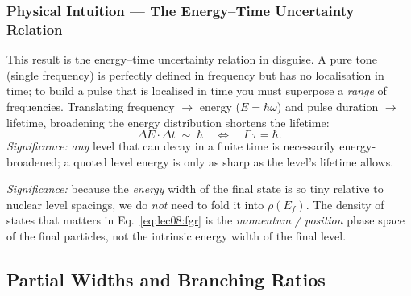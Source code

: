 \subsubsection*{Physical Intuition --- The Energy--Time Uncertainty Relation}
This result is the energy--time uncertainty relation in disguise.  A pure tone
(single frequency) is perfectly defined in frequency but has no localisation in
time; to build a pulse that is localised in time you must superpose a
\emph{range} of frequencies.  Translating frequency $\to$ energy
($E=\hbar\omega$) and pulse duration $\to$ lifetime, broadening the energy
distribution shortens the lifetime:
\begin{equation}
  \label{eq:lec08:uncertainty}
  \boxed{\Delta E \cdot \Delta t \;\sim\; \hbar
         \quad\Longleftrightarrow\quad \Gamma\,\tau = \hbar.}
\end{equation}
\textit{Significance:} \emph{any} level that can decay in a finite time is
necessarily energy-broadened; a quoted level energy is only as sharp as the
level's lifetime allows.

\textit{Significance:} because the \emph{energy} width of the final state is so
tiny relative to nuclear level spacings, we do \emph{not} need to fold it into
$\rho(E_f)$.  The density of states that matters in
Eq.~\eqref{eq:lec08:fgr} is the \emph{momentum / position} phase space of the
final particles, not the intrinsic energy width of the final level.

\subsection{Partial Widths and Branching Ratios}
\label{subsec:lec08:branching}

